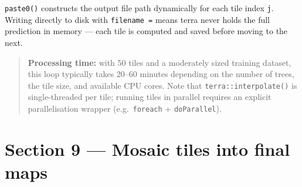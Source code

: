 \documentclass[
  10pt,
  b5paper,
  oneside]{book}
\begin{document}
\texttt{paste0()} constructs the output file path dynamically for each tile index \texttt{j}. Writing directly to disk with \texttt{filename\ =} means terra never holds the full prediction in memory --- each tile is computed and saved before moving to the next.

\begin{quote}
\textbf{Processing time:} with 50 tiles and a moderately sized training dataset, this loop typically takes 20--60 minutes depending on the number of trees, the tile size, and available CPU cores. Note that \texttt{terra::interpolate()} is single-threaded per tile; running tiles in parallel requires an explicit parallelisation wrapper (e.g.~\texttt{foreach} + \texttt{doParallel}).
\end{quote}

\section*{Section 9 --- Mosaic tiles into final maps}\label{section-9-mosaic-tiles-into-final-maps}
\end{document}
